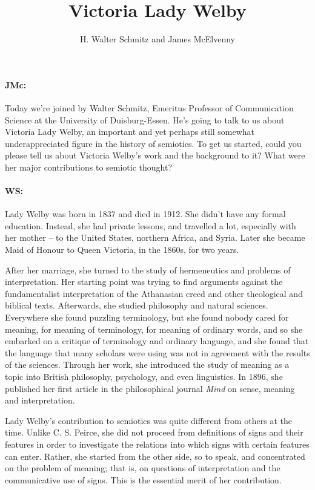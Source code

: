 \documentclass[output=paper]{langscibook}
\author{H. Walter Schmitz\orcid{}\affiliation{University College London} and James McElvenny\affiliation{University of Siegen}}
\title{Victoria Lady Welby}
\begin{document}
\maketitle 


\paragraph*{JMc:} Today we’re joined by Walter Schmitz, Emeritus Professor of Communication Science at the University of Duisburg-Essen. He’s going to talk to us about Victoria Lady Welby, an important and yet perhaps still somewhat underappreciated figure in the history of semiotics. To get us started, could you please tell us about Victoria Welby’s work and the background to it? What were her major contributions to semiotic thought?

\paragraph*{WS:} Lady Welby was born in 1837 and died in 1912. She didn’t have any formal education. Instead, she had private lessons, and travelled a lot, especially with her mother – to the United States, northern Africa, and Syria. Later she became Maid of Honour to Queen Victoria, in the 1860s, for two years.

After her marriage, she turned to the study of hermeneutics and problems of interpretation. Her starting point was trying to find arguments against the fundamentalist interpretation of the Athanasian creed and other theological and biblical texts. Afterwards, she studied philosophy and natural sciences. Everywhere she found puzzling terminology, but she found nobody cared for meaning, for meaning of terminology, for meaning of ordinary words, and so she embarked on a critique of terminology and ordinary language, and she found that the language that many scholars were using was not in agreement with the results of the sciences. Through her work, she introduced the study of meaning as a topic into British philosophy, psychology, and even linguistics. In 1896, she published her first article in the philosophical journal \textit{Mind} on sense, meaning and interpretation.

Lady Welby’s contribution to semiotics was quite different from others at the time. Unlike C. S. Peirce, she did not proceed from definitions of signs and their features in order to investigate the relations into which signs with certain features can enter. Rather, she started from the other side, so to speak, and concentrated on the problem of meaning; that is, on questions of interpretation and the communicative use of signs. This is the essential merit of her contribution.
\end{document}

